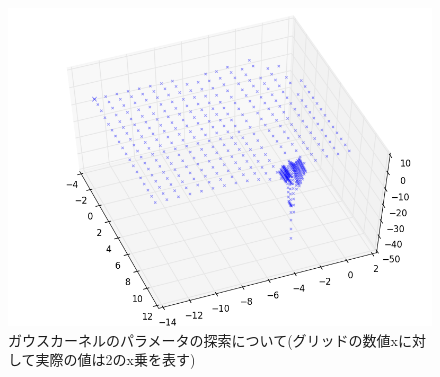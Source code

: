 \documentclass[]{jsarticle}
\begin{document}
\begin{figure}[htbp]
\begin{minipage}[b]{0.5\hsize}
 \end{minipage}
 \begin{minipage}[b]{0.5\hsize}
  \includegraphics[scale=0.4]{./images/gauss_cross_coef.png}
 \end{minipage}
 \caption{ガウスカーネルのパラメータの探索について(グリッドの数値xに対して実際の値は2のx乗を表す)}
\end{figure}

\newpage
\end{document}
